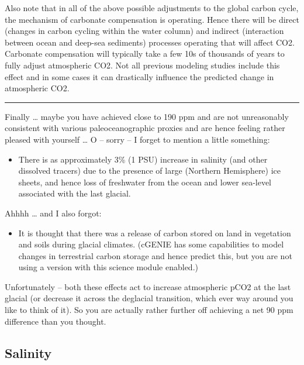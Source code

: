 \documentclass[11pt,fleqn]{book} %
\begin{document}
Also note that in all of the above possible adjustments to the global carbon cycle, the mechanism
of carbonate compensation is operating. Hence there will be direct (changes in carbon cycling
within the water column) and indirect (interaction between ocean and deep-sea sediments)
processes operating that will affect CO2. Carbonate compensation will typically take a few 10s of
thousands of years to fully adjust atmospheric CO2. Not all previous modeling studies include this
effect and in some cases it can drastically influence the predicted change in atmospheric CO2.

\vspace{1mm}
\noindent\rule{4cm}{0.5pt}
\vspace{2mm}

Finally … maybe you have achieved close to 190 ppm and are not unreasonably consistent with
various paleoceanographic proxies and are hence feeling rather pleased with yourself … O -- sorry -- I forget to mention a little something:

\begin{itemize}[noitemsep]
\setlength{\itemindent}{.2in}
\item
There is as approximately 3\% (1 PSU) increase in salinity (and other dissolved tracers)
due to the presence of large (Northern Hemisphere) ice sheets, and hence loss of
freshwater from the ocean and lower sea-level associated with the last glacial.
\end{itemize}

\noindent Ahhhh … and I also forgot:

\begin{itemize}[noitemsep]
\setlength{\itemindent}{.2in}
\item It is thought that there was a release of carbon stored on land in vegetation and soils during
glacial climates. (cGENIE has some capabilities to model changes in terrestrial carbon
storage and hence predict this, but you are not using a version with this science module
enabled.)
\end{itemize}

Unfortunately – both these effects act to increase atmospheric pCO2 at the last glacial (or decrease
it across the deglacial transition, which ever way around you like to think of it). So you are actually
rather further off achieving a net 90 ppm difference than you thought.

%
\subsection{Salinity}
\end{document}

